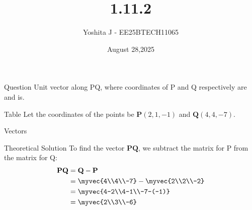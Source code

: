\documentclass{beamer}
\begin{document}
\title 
{1.11.2}
\date{August 28,2025}


\author 
{Yoshita J - EE25BTECH11065}






\frame{\titlepage}
\begin{frame}{Question}
  Unit vector along PQ, where coordinates of P and Q respectively are  and  is.\\
\end{frame}



\begin{frame}{Table}
Let the coordinates of the points be $\mathbf{P}(2, 1, -1)$ and $\mathbf{Q}(4, 4, -7)$.
\begin{table}[H]    
  \centering
  
  \caption{Vectors}
  \label{Answers}
\end{table}
\end{frame}
\begin{frame}{Theoretical Solution}
To find the vector \(\mathbf{PQ}\), we subtract the matrix for P from the matrix for Q:
\begin{align}
    \mathbf{PQ} &= \mathbf{Q} - \mathbf{P} \\
    &= 
   \myvec{4\\4\\-7}
    -
    \myvec{2\\2\\-2} \\
    &= 
    \myvec{4-2\\4-1\\-7-(-1)} \\
    &= 
    \myvec{2\\3\\-6}
\end{align}

\end{frame}
\end{document}
